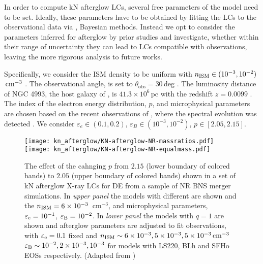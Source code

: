 In order to compute \ac{kN} afterglow \acp{LC}, 
several free parameters of the model need to be set. 
Ideally, these parameters have to be obtained by fitting the \acp{LC} to the 
observational data via \eg{}, Bayesian methods. Instead we opt to consider the 
parameters inferred for \GRB{} afterglow by prior studies and investigate, whether 
within their range of uncertainty they can lead to \acp{LC} compatible with observations, 
leaving the more rigorous analysis to future works.

Specifically, we consider the \ac{ISM} density to be uniform with 
$n_{\text{ISM}}\in(10^{-3}, 10^{-2})$ $\,\text{cm}^{-3}$ \citep{Hajela:2019mjy}. 
The observational angle, 
is set to $\theta_{\text{obs}}=30\,$deg \citep{TheLIGOScientific:2017qsa}.
The luminosity distance of NGC 4993, the host galaxy of \GW{}, is $41.3\times10^{6}\,$pc 
with the redshift $z=0.0099$ \citep{Hjorth:2017yza}.
%
The index of the electron energy distribution, $p$, and microphysical parameters are 
chosen based on the recent observations of \GRB{}, where the spectral evolution 
was detected \citep{Hajela:2021faz}.  
%
We consider 
$\varepsilon_e\in(0.1, 0.2)$,
$\varepsilon_B\in(10^{-3}, 10^{-2})$, 
$p\in[2.05,2.15]$.


\begin{figure}
    \begin{center}
        \texttt{[image: kn\_afterglow/KN-afterglow-NR-massratios.pdf]}
        \hspace{-5mm}
        \texttt{[image: kn\_afterglow/KN-afterglow-NR-equalmass.pdf]}
        \caption{
            The effect of the cahnging $p$ from $2.15$ (lower boundary of colored bands) to 
            $2.05$ (upper boundary of colored bands) shown in a set of \ac{kN} afterglow 
            X-ray \acp{LC} for \ac{DE} from a sample of \ac{NR} \ac{BNS} merger simulations.
            In \emph{upper panel} the models with different \mr{} are shown and the 
            $n_{\text{ISM}}=6\times10^{-3}$~cm$^{-3}$, and microphysical parameters, 
            $\varepsilon_{\rm e}=10^{-1}$, $\varepsilon_{\rm B}=10^{-2}$.
            In \emph{lower panel} the models with $q=1$ are shown and afterglow
            parameters are adjusted to fit observations, 
            with $\varepsilon_{\rm e}=0.1$ fixed and  
            $n_{\text{ISM}}\sim 6\times 10^{-3}, 5\times 10^{-3},5\times 10^{-3}\,\rm{cm^{-3}}$
            $\varepsilon_{\rm B}\sim 10^{-2},2\times 10^{-3},10^{-3}$ for models with 
            LS220, BLh and SFHo \acp{EOS} respectively.
            (Adapted from \citet{Hajela:2021faz})
        } \label{fig:kn_afterglow}
    \end{center}
\end{figure}

